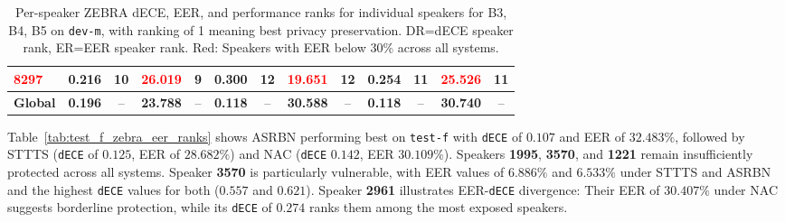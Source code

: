 \documentclass[12pt,leqno,a4paper]{article}
\begin{document}
\begin{table}[H]
\begin{tabular}{lcccccccccccc}
\textcolor{red}{8297} 
     & 0.216 & 10 & \textcolor{red}{26.019} & 9  
     & 0.300 & 12 & \textcolor{red}{19.651} & 12 
     & 0.254 & 11 & \textcolor{red}{25.526} & 11 \\
\midrule
\textbf{Global}
& \textbf{0.196} & -- & \textbf{23.788} & --
& \textbf{0.118} & -- & \textbf{30.588} & --
& \textbf{0.118} & -- & \textbf{30.740} & -- \\
\bottomrule
\end{tabular}
\caption{Per-speaker ZEBRA dECE, EER, and performance ranks for individual speakers for B3, B4, B5 on \texttt{dev-m}, with ranking of 1 meaning best privacy preservation. DR=dECE speaker rank, ER=EER speaker rank. Red: Speakers with EER below $30\%$ across all systems.}
\label{tab:dev_m_zebra_eer_ranks}
\end{table}

Table~\ref{tab:test_f_zebra_eer_ranks} shows ASRBN performing best on  \texttt{test-f} with \texttt{dECE} of $0.107$ and EER of $32.483\%$, followed by STTTS (\texttt{dECE} of $0.125$, EER of $28.682\%$) and NAC (\texttt{dECE} $0.142$, EER $30.109\%$). Speakers \textbf{1995}, \textbf{3570}, and \textbf{1221} remain insufficiently protected across all systems. Speaker \textbf{3570} is particularly vulnerable, with EER values of $6.886\%$ and $6.533\%$ under STTTS and ASRBN and the highest \texttt{dECE} values for both ($0.557$ and $0.621$). Speaker \textbf{2961} illustrates EER-\texttt{dECE} divergence: Their EER of $30.407\%$ under NAC suggests borderline protection, while its \texttt{dECE} of $0.274$ ranks them among the most 
exposed speakers.
\end{document}
